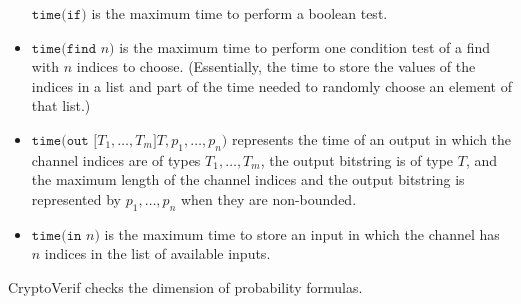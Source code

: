 \begin{itemize}
$\texttt{time(if)}$ is the maximum time to perform a boolean test.
\item
$\texttt{time(find }n\texttt{)}$ is the maximum time to perform 
one condition test of a find with $n$ indices to choose.
(Essentially, the time to store the values of the indices in a 
list and part of the time needed to randomly choose an element
of that list.)
\ifchannels
\item
$\texttt{time(out [}T_1, \ldots, T_m\texttt{]}T, p_1, \ldots, p_n\texttt{)}$
represents the time of an output in which the channel indices are
of types $T_1, \ldots, T_m$, the output bitstring is of type $T$,
and the maximum length of the channel indices and the output bitstring
is represented by $p_1, \ldots, p_n$ when they are non-bounded.
\item
$\texttt{time(in }n\texttt{)}$ is the maximum time to store an
input in which the channel has $n$ indices in the list of
available inputs.
\fi
\end{itemize}
CryptoVerif checks the dimension of probability formulas.

